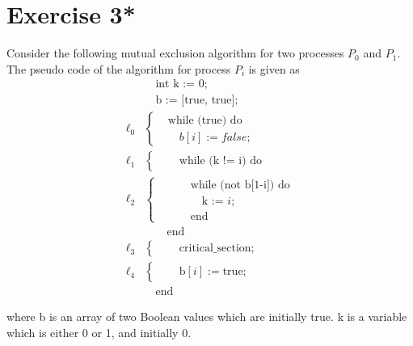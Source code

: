 \documentclass[a4paper,12pt]{article}
\begin{document}
\section{Exercise 3*}
Consider the following mutual exclusion algorithm for two processes $P_0$ and $P_1$.\\
The pseudo code of the algorithm for process $P_i$ is given as
\[
\begin{aligned}
    &\quad\text{int k := 0;} \\
    &\quad\text{b := [true, true];} \\
    \ell_0 &\left\{
        \begin{aligned}
            & \text{while (true) do} \\
            & \quad b[i] := \mathit{false};
        \end{aligned}
    \right. \\
    \ell_1 &\left\{
        \begin{aligned}
            & \quad\text{while (k != i) do}
        \end{aligned}
    \right. \\
    \ell_2 &\left\{
        \begin{aligned}
            & \qquad\text{while (not b[1-i]) do} \\
            & \qquad\quad \text{k := } i\text{;} \\
            & \qquad\text{end}
        \end{aligned}
    \right. \\
    &\qquad\text{end} \\
    \ell_3 &\left\{
        \begin{aligned}
            & \quad\text{critical\_section;}
        \end{aligned}
    \right. \\
    \ell_4 &\left\{
        \begin{aligned}
            & \quad\text{b}[i] := \text{true;}
        \end{aligned}
    \right. \\
    &\quad\text{end} %
\end{aligned}
\]

where b is an array of two Boolean values which are initially true. k is a variable which is either 0 or 1, and
initially 0.
\end{document}
